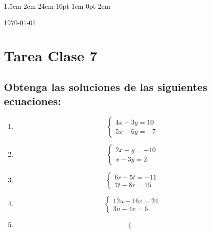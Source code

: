 \documentclass[12pt,letterpaper]{report}
\begin{document}
\setmargins{2.5cm}      
{1.5cm}                     
{2cm}  
{24cm}                    
{10pt}                          
{1cm}                          
{0pt}                             
{2cm}
\begin{flushright}
\today
\end{flushright}
\vspace{-1.75cm}
\section*{Tarea Clase 7}
\subsection*{Obtenga las soluciones de las siguientes ecuaciones:}
\begin{enumerate}
    \item\begin{equation*}
        \left\lbrace \begin{matrix}
             4x+3y=10 \\
             5x-6y=-7
        \end{matrix} \right.
    \end{equation*}
    \item\begin{equation*}
        \left\lbrace \begin{matrix}
           2x+y=-10 \\
           x-3y=2  
        \end{matrix} \right.
    \end{equation*}
    \item\begin{equation*}
        \left\lbrace \begin{matrix}
             6r-5t=-11\\
             7t-8r=15
        \end{matrix} \right.
    \end{equation*}
    \item\begin{equation*}
        \left\lbrace \begin{matrix}
             12u-16v=24\\
             3u-4v=6
        \end{matrix} \right.
    \end{equation*}
    \item\begin{equation*}
        \left\lbrace \begin{matrix}

\end{matrix}
\end{equation*}
\end{enumerate}
\end{document}
